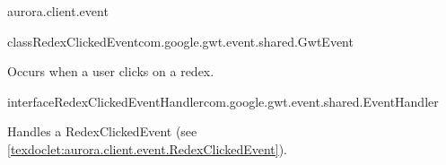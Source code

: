 \begin{texdocpackage}{aurora.client.event}
\begin{texdocclass}{class}{RedexClickedEvent}{com.google.gwt.event.shared.GwtEvent}{}
\label{texdoclet:aurora.client.event.RedexClickedEvent}
\begin{texdocclassintro}
Occurs when a user clicks on a redex.\end{texdocclassintro}
\begin{texdocclassfields}
\end{texdocclassfields}
\begin{texdocclassconstructors}
\end{texdocclassconstructors}
\begin{texdocclassmethods}
\end{texdocclassmethods}
\end{texdocclass}


\begin{texdocclass}{interface}{RedexClickedEventHandler}{}{com.google.gwt.event.shared.EventHandler}
\label{texdoclet:aurora.client.event.RedexClickedEventHandler}
\begin{texdocclassintro}
Handles a RedexClickedEvent (see \ref{texdoclet:aurora.client.event.RedexClickedEvent}).\end{texdocclassintro}
\begin{texdocclassmethods}
\end{texdocclassmethods}
\end{texdocclass}



\end{texdocpackage}
